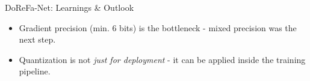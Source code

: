 \documentclass[aspectratio=169]{beamer} %
\begin{document}
\begin{frame}{DoReFa-Net: Learnings \& Outlook}
  \begin{itemize}
    \item Gradient precision (min. 6 bits) is the bottleneck - mixed precision was the next step.
    \item Quantization is not \textit{just for deployment} - it can be applied inside the training pipeline.
  \end{itemize}
\end{frame}





\end{document}
